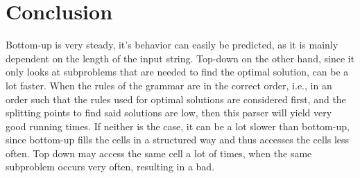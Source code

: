 \section{Conclusion}


Bottom-up is very steady, it's behavior can easily be predicted, as it is mainly dependent on the length of the input string.
Top-down on the other hand, since it only looks at subproblems that are needed to find the optimal solution, can be a lot faster.
When the rules of the grammar are in the correct order, i.e., in an order such that the rules used for optimal solutions are considered first, and the splitting points to find said solutions are low, then this parser will yield very good running times.
If neither is the case, it can be a lot slower than bottom-up, since bottom-up fills the cells in a structured way and thus accesses the cells less often.
Top down may access the same cell a lot of times, when the same subproblem occurs very often, resulting in a bad.


